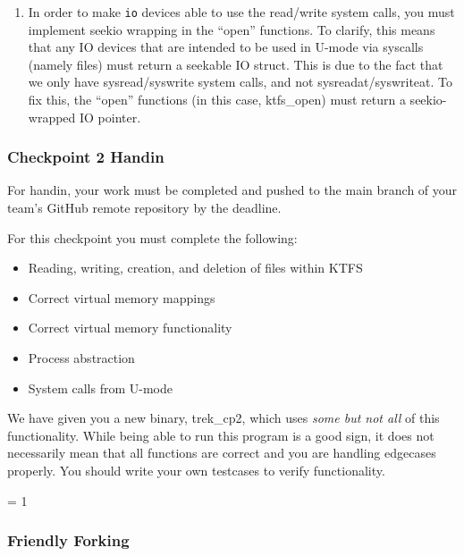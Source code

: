 \documentclass{article}
\begin{document}
\begin{enumerate}
			\item In order to make \texttt{io} devices able to use the read/write system calls, you must implement {\fix seekio} wrapping in the ``open'' functions. To clarify, this means
			that any IO devices that are intended to be used in U-mode via syscalls (namely files) must return a seekable IO struct. This is due to the fact that we only have {\fix sysread/syswrite}
			system calls, and not {\fix sysreadat/syswriteat}. To fix this, the ``open'' functions (in this case, {\fix ktfs\_open}) must return a {\fix seekio}-wrapped IO pointer.
			
		\end{enumerate}
	
		\subsubsection{Checkpoint 2 Handin}

		For handin, your work must be completed and pushed to the {\fix main} branch of your team's GitHub remote repository by the deadline.

		For this checkpoint you must complete the following:

		\begin{itemize}
			\item Reading, writing, creation, and deletion of files within KTFS
			\item Correct virtual memory mappings
			\item Correct virtual memory functionality
			\item Process abstraction
			\item System calls from U-mode
		\end{itemize}

		We have given you a new binary, {\fix trek\_cp2}, which uses \textit{some but not all} of this functionality. While being
		able to run this program is a good sign, it does not necessarily mean that all functions are correct and you are handling edgecases
		properly. You should write your own testcases to verify functionality.

	\pagebreak
\else
\fi

\ifnum\rendercpiii = 1
	\subsubsection{Friendly Forking}
	
\end{document}
